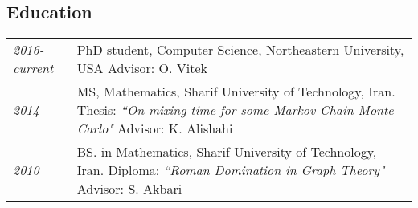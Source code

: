 \documentclass[11pt]{article}
\newcommand{\place}[1]{{\sc #1}}
\newcommand{\entry}[2]{{\emph{#1}}&{ #2 }\\[0.22cm]}
\begin{document}
\subsection*{Education}
\vspace{-.25cm}
\begin{tabular}{@{}p{1.5cm}p{14.5cm}}
\entry{2016-current} {PhD student, Computer Science, \place{Northeastern University}, USA
\newline Advisor: O. Vitek}

\entry{2014}{MS, Mathematics, \place{Sharif University of Technology}, Iran.
\newline Thesis: {\it ``On mixing time for some Markov Chain Monte Carlo"}
\newline Advisor: K. Alishahi
}

\entry{2010}{BS. in Mathematics, \place{Sharif University of Technology}, Iran.
\newline Diploma: {\it ``Roman Domination in Graph Theory"}
\newline Advisor: S. Akbari 
}
\end{tabular}

\vspace{-0.5cm}

\end{document}
